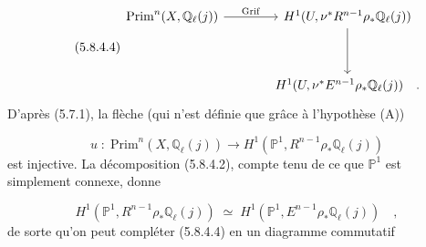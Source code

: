 \begin{equation}\tag{5.8.4.4}
\begin{tikzcd}[row sep=huge, column sep=large]
\mathrm{Prim}^n(X,\mathbb{Q}_\ell(j)) \arrow[r, "\mathrm{Grif}"] & H^1(U,\nu^*R^{n-1}\rho_*\mathbb{Q}_\ell(j)) \arrow[d] \\
 {} & H^1(U,\nu^*E^{n-1}\rho_*\mathbb{Q}_\ell(j)) \quad .
\end{tikzcd}
\end{equation}
D'après (5.7.1), la flèche (qui n'est définie que grâce à l'hypothèse (A))

\begin{equation}\tag{5.8.4.5}
u \;:\; \mathrm{Prim}^n(X,\mathbb{Q}_\ell(j)) \longrightarrow H^1(\mathbb{P}^1,R^{n-1}\rho_*\mathbb{Q}_\ell(j))
\end{equation}
est injective. La décomposition (5.8.4.2), compte tenu de ce que $\mathbb{P}^1$ est simplement connexe, donne

\begin{equation}\tag{5.8.4.6}
H^1(\mathbb{P}^1,R^{n-1}\rho_*\mathbb{Q}_\ell(j)) \;\simeq\; H^1(\mathbb{P}^1,E^{n-1}\rho_*\mathbb{Q}_\ell(j)) \quad ,
\end{equation}
de sorte qu'on peut compléter (5.8.4.4) en un diagramme commutatif 



